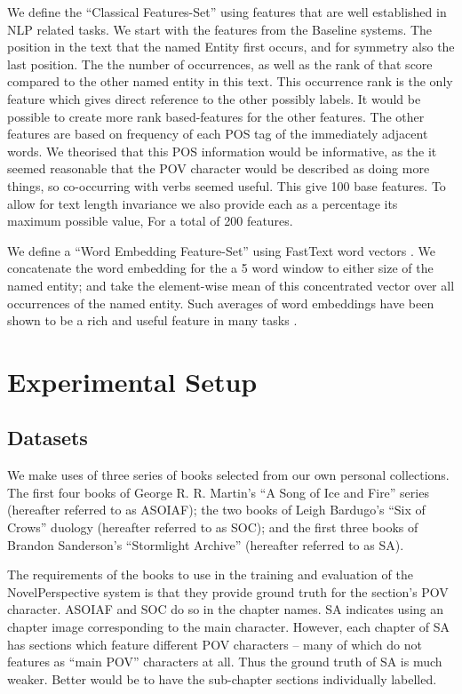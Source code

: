 \documentclass[11pt,a4paper]{article}
\newcommand{\parencite}{\citep}
\begin{document}
We define the  ``Classical Features-Set'' using features that are well established in NLP related tasks.
We start with the features from the Baseline systems.
The position in the text that the named Entity first occurs, and for symmetry also the last position.
The the number of occurrences, as well as the rank of that score compared to the other named entity in this text.
This occurrence rank is the only feature which gives direct reference to the other possibly labels.
It would be possible to create more rank based-features for the other features.
The other features are based on frequency of each POS tag of the immediately adjacent words.
We theorised that this POS information would be informative, as the it seemed reasonable that the POV character would be described as doing more things, so co-occurring with verbs seemed useful.
This give 100 base features.
To allow for text length invariance we also provide each as a percentage its maximum possible value, For a total of 200 features.

We define a ``Word Embedding Feature-Set'' using FastText word vectors \parencite{bojanowski2016enriching}.
We concatenate the word embedding for the a 5 word window to either size of the named entity;
and take the element-wise mean of this concentrated vector over all occurrences of the named entity.
Such averages of word embeddings have been shown to be a rich and useful feature in many tasks \cite{White2015SentVecMeaning,mikolovSkip}.





\section{Experimental Setup}\label{sec:experimental-setup}
\subsection{Datasets}
We make uses of three series of books selected from our own personal collections.
The first four books of George R. R. Martin's ``A Song of Ice and Fire'' series (hereafter referred to as ASOIAF);
the two books of  Leigh Bardugo's ``Six of Crows'' duology (hereafter referred to as SOC);
and the first three books of Brandon Sanderson's ``Stormlight Archive'' (hereafter referred to as SA).


The requirements of the books to use in the training and evaluation of the NovelPerspective system is that they provide ground truth for the section's POV  character.
ASOIAF and SOC do so in the chapter names.
SA indicates using an chapter image corresponding to the main character.
However, each chapter of SA has sections which feature different POV characters -- many of which do not features as ``main POV'' characters at all.
Thus the ground truth of SA is much weaker.
Better would be to have the sub-chapter sections individually labelled.
\end{document}

